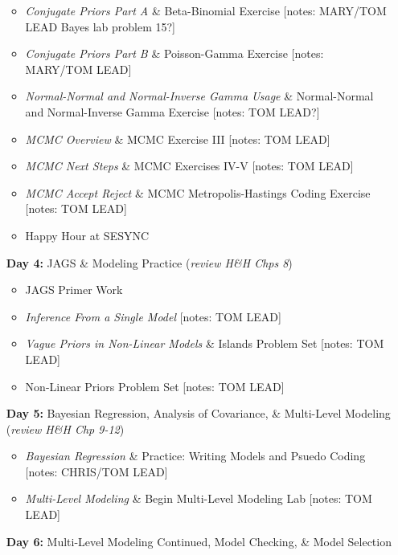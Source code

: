 \documentclass[11pt]{article}
\begin{document}
\begin{enumerate}
\begin{itemize}
\item \emph{Conjugate Priors Part A} \& Beta-Binomial Exercise [notes: MARY/TOM LEAD Bayes lab problem 15?]
\item \emph{Conjugate Priors Part B} \& Poisson-Gamma Exercise [notes: MARY/TOM LEAD] 
\item \emph{Normal-Normal and Normal-Inverse Gamma Usage} \& Normal-Normal and Normal-Inverse Gamma Exercise [notes: TOM LEAD?] 
\item \emph{MCMC Overview} \& MCMC Exercise III [notes: TOM LEAD] 
\item \emph{MCMC Next Steps} \& MCMC Exercises IV-V [notes: TOM LEAD] 
\item \emph{MCMC Accept Reject} \& MCMC Metropolis-Hastings Coding Exercise [notes: TOM LEAD]
\item Happy Hour at SESYNC 
\end{itemize}

\newpage 

\item[\textbf{Day 4:}] JAGS \& Modeling Practice (\emph{review H\&H Chps 8})

\begin{itemize}
\item JAGS Primer Work
\item \emph{Inference From a Single Model}  [notes: TOM LEAD]
\item \emph{Vague Priors in Non-Linear Models} \& Islands Problem Set  [notes: TOM LEAD] 
\item Non-Linear Priors Problem Set  [notes: TOM LEAD]
\end{itemize}

\item[\textbf{Day 5:}] Bayesian Regression, Analysis of Covariance, \& Multi-Level Modeling (\emph{review H\&H Chp 9-12})

\begin{itemize}
\item \emph{Bayesian Regression} \& Practice: Writing Models and Psuedo Coding [notes: CHRIS/TOM LEAD]
\item \emph{Multi-Level Modeling} \& Begin Multi-Level Modeling Lab  [notes: TOM LEAD] 
\end{itemize}


\item[\textbf{Day 6:}] Multi-Level Modeling Continued, Model Checking, \& Model Selection


\end{enumerate}
\end{document}
